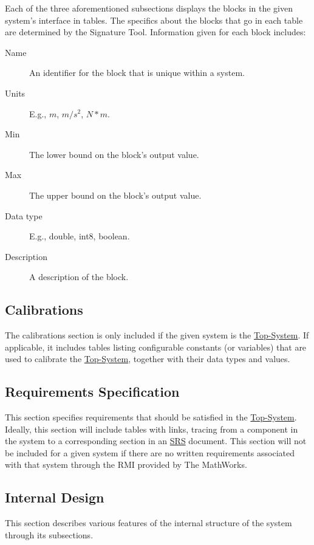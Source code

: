\documentclass{mcscert}
\newcommand{\mathworks}{The MathWorks}
\newcommand{\sigtool}{Signature Tool}
\newcommand{\topsystemnolink}{Top-System} %
\newcommand{\topsystem}{\hyperref[def:topsystem]{\topsystemnolink{}}}
\begin{document}
Each of the three aforementioned subsections displays the blocks in the given system's interface in tables. 
The specifics about the blocks that go in each table are determined by the \sigtool{}. 
Information given for each block includes:\\
    \begin{description}
      \item [Name\label{itm:int-name-description}] An identifier for the block that is unique within a system.
      \item [Units\label{itm:int-units-description}] E.g., $m$, $m/s^2$, $N*m$.
      \item [Min\label{itm:int-min-description}] The lower bound on the block's output value.
      \item [Max\label{itm:int-max-description}] The upper bound on the block's output value.
      \item [Data type\label{itm:int-datatype-description}] E.g., double, int8, boolean.
      \item [Description\label{itm:int-descr-description}] A description of the block.
    \end{description}
    
    \subsection{Calibrations}
    \label{ssec:calibrations}
    The calibrations section is only included if the given system is the \topsystem{}. 
    If applicable, it includes tables listing configurable constants (or variables) that are used to calibrate the \topsystem{}, together with their data types and values.
    
    \subsection{Requirements Specification}
    \label{ssec:req-spec-description}
    This section specifies requirements that should be satisfied in the \topsystem{}. 
    Ideally, this section will include tables with links, tracing from a component in the system to a corresponding section in an \hyperref[acr:srs]{SRS} document. 
    This section will not be included for a given system if there are no written requirements associated with that system through the RMI provided by \mathworks{}.
      
    \subsection{Internal Design}
    \label{ssec:int-design-description}
    This section describes various features of the internal structure of the system through its subsections.
    
\end{document}
